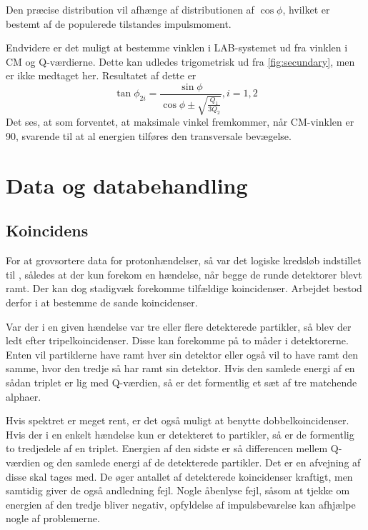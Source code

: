 Den præcise distribution vil afhænge af distributionen af $\cos \phi$, hvilket er bestemt af de populerede
tilstandes impulsmoment. 

Endvidere er det muligt at bestemme vinklen i LAB-systemet ud fra vinklen i CM og Q-værdierne. Dette
kan udledes trigometrisk ud fra \cref{fig:secundary}, men er ikke medtaget her. Resultatet af dette
er
\begin{equation}
  \label{eq:sekv-vinkel}
  \tan \phi_{2i} = \frac{\sin \phi}{\cos \phi \pm \sqrt{\frac{Q_{1}}{3Q_{2}}}}, i = 1,2 
\end{equation}
Det ses, at som forventet, at maksimale vinkel fremkommer, når CM-vinklen er 90\degree, svarende til
at al energien tilføres den transversale bevægelse. 

\section{Data og databehandling}
\label{sec:sek-data}

\subsection{Koincidens}
\label{sec:koincidens}
For at grovsortere data for protonhændelser, så var det logiske kredsløb indstillet til \lAND,
således at der kun forekom en hændelse, når begge de runde detektorer blevt ramt. Der kan dog
stadigvæk forekomme tilfældige koincidenser. Arbejdet bestod derfor i at bestemme de sande
koincidenser.

Var der i en given hændelse var tre eller flere detekterede partikler, så blev der ledt efter
tripelkoincidenser. Disse kan forekomme på to måder i detektorerne. Enten vil partiklerne have ramt
hver sin detektor eller også vil to have ramt den samme, hvor den tredje så har ramt sin
detektor. Hvis den samlede energi af en sådan triplet er lig med Q-værdien, så er det formentlig et
sæt af tre matchende alphaer. 

Hvis spektret er meget rent, er det også muligt at benytte dobbelkoincidenser. Hvis der i en enkelt
hændelse kun er detekteret to partikler, så er de formentlig to tredjedele af en triplet. Energien
af den sidste er så differencen mellem Q-værdien og den samlede energi af de detekterede
partikler. Det er en afvejning af disse skal tages med. De øger antallet af detekterede koincidenser
kraftigt, men samtidig giver de også andledning fejl. Nogle åbenlyse fejl, såsom at tjekke om
energien af den tredje bliver negativ, opfyldelse af impulsbevarelse kan afhjælpe nogle af
problemerne.

